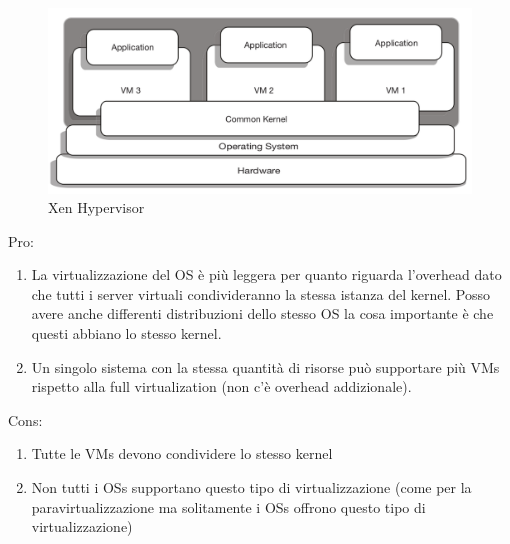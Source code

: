 \documentclass{article}
\begin{document}
\begin{figure}[H]
\centering
\includegraphics[scale=0.4]{img/Virt_tech/20.png}
\caption{Xen Hypervisor}
\end{figure}\noindent
Pro:
\begin{enumerate}
    \item La virtualizzazione del OS è più leggera per quanto riguarda l'overhead dato che tutti i server virtuali condivideranno la stessa istanza del kernel. Posso avere anche differenti distribuzioni dello stesso OS la cosa importante è che questi abbiano lo stesso kernel.
    \item Un singolo sistema con la stessa quantità di risorse può supportare più VMs rispetto alla full virtualization (non c'è overhead addizionale).
\end{enumerate}
Cons:
\begin{enumerate}
    \item Tutte le VMs devono condividere lo stesso kernel
    \item Non tutti i OSs supportano questo tipo di virtualizzazione (come per la paravirtualizzazione ma solitamente i OSs offrono questo tipo di virtualizzazione)
\end{enumerate}
\end{document}
